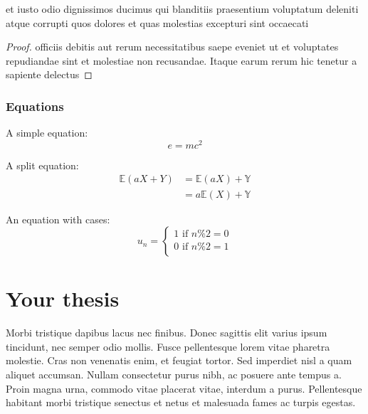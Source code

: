 \documentclass[12pt, twoside]{report}
\begin{document}
\begin{proposition}
    et iusto odio dignissimos ducimus qui blanditiis praesentium voluptatum deleniti atque corrupti quos dolores et quas molestias excepturi sint occaecati 
\end{proposition}
\begin{proof}
    officiis debitis aut rerum necessitatibus saepe eveniet ut et voluptates repudiandae sint et molestiae non recusandae. 
Itaque earum rerum hic tenetur a sapiente delectus
\end{proof}

\subsection{Equations}

A simple equation:
\begin{equation}
    e = mc^2
\end{equation}

A split equation:
\begin{equation}
    \begin{split}
        \mathbb{E}(aX + Y) &= \mathbb{E}(aX) + \mathbb{Y}\\
                           &= a\mathbb{E}(X) + \mathbb{Y}
    \end{split}
\end{equation}

An equation with cases:
\begin{equation}
    u_n =
    \begin{cases}
        1 \text{ if } n\%2=0 \\
        0 \text{ if } n\%2=1 \\
    \end{cases}
\end{equation}



\chapter{Your thesis}\label{chp:stuff}
Morbi tristique dapibus lacus nec finibus. 
Donec sagittis elit varius ipsum tincidunt, nec semper odio mollis. 
Fusce pellentesque lorem vitae pharetra molestie. 
Cras non venenatis enim, et feugiat tortor. 
Sed imperdiet nisl a quam aliquet accumsan.
Nullam consectetur purus nibh, ac posuere ante tempus a. 
Proin magna urna, commodo vitae placerat vitae, interdum a purus. 
Pellentesque habitant morbi tristique senectus et netus et malesuada fames ac turpis egestas.
\end{document}
